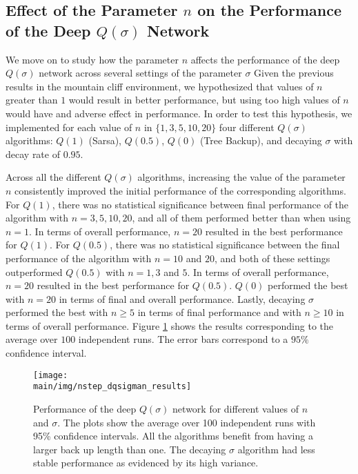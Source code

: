 \subsection{Effect of the Parameter $n$ on the Performance of the Deep $Q(\sigma)$ Network}

We move on to study how the parameter $n$ affects the performance of the deep $Q(\sigma)$ network across several settings of the parameter $\sigma$
Given the previous results in the mountain cliff environment, we hypothesized that values of $n$ greater than $1$ would result in better performance, but using too high values of $n$ would have and adverse effect in performance.
In order to test this hypothesis, we implemented for each value of $n$ in $\{1,3,5,10,20\}$ four different $Q(\sigma)$ algorithms: $Q(1)$ (Sarsa), $Q(0.5)$, $Q(0)$ (Tree Backup), and decaying $\sigma$ with decay rate of $0.95$.

Across all the different $Q(\sigma)$ algorithms, increasing the value of the parameter $n$ consistently improved the initial performance of the corresponding algorithms.
For $Q(1)$, there was no statistical significance between final performance of the algorithm with $n = 3, 5, 10, 20$, and all of them performed better than when using $n = 1$. 
In terms of overall performance, $n = 20$ resulted in the best performance for $Q(1)$.
For $Q(0.5)$, there was no statistical significance between the final performance of the algorithm with $n = 10$ and $20$, and both of these settings outperformed $Q(0.5)$ with $n = 1, 3$ and $5$.
In terms of overall performance, $n = 20$ resulted in the best performance for $Q(0.5)$.
$Q(0)$ performed the best with $n = 20$ in terms of final and overall performance.
Lastly, decaying $\sigma$ performed the best with $n \geq 5$ in terms of final performance and with $n \geq 10$ in terms of overall performance. 
Figure \ref{fig:nstep_dqsigman_results} shows the results corresponding to the average over $100$ independent runs.
The error bars correspond to a $95\%$ confidence interval.

\begin{figure}[t]
    \setlength{\abovecaptionskip}{0pt plus 0pt minus 0pt}
    \centering
    \texttt{[image: \\main/img/nstep\_dqsigman\_results]}
    \caption[Performance of the Deep $Q(\sigma)$ Network for Different Values of $n$ and $\sigma$] {Performance of the deep $Q(\sigma)$ network for different values of $n$ and $\sigma$.
    The plots show the average over 100 independent runs with 95\% confidence intervals.
    All the algorithms benefit from having a larger back up length than one.
    The decaying $\sigma$ algorithm had less stable performance as evidenced by its high variance.
    }
    \label{fig:nstep_dqsigman_results}
\end{figure}


